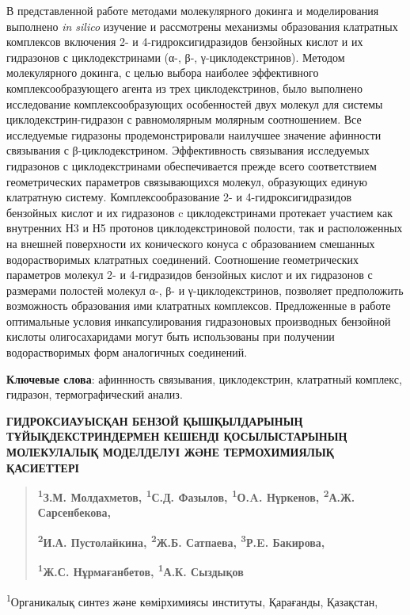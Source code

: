В представленной работе методами молекулярного докинга и моделирования
выполнено \emph{in silico} изучение и рассмотрены механизмы образования
клатратных комплексов включения 2- и 4-гидроксигидразидов бензойных
кислот и их гидразонов с циклодекстринами (α-, β-, γ-циклодекстринов).
Методом молекулярного докинга, с целью выбора наиболее эффективного
комплексообразующего агента из трех циклодекстринов, было выполнено
исследование комплексообразующих особенностей двух молекул для системы
циклодекстрин-гидразон с равномолярным молярным соотношением. Все
исследуемые гидразоны продемонстрировали наилучшее значение афинности
связывания с β-циклодекстрином. Эффективность связывания исследуемых
гидразонов с циклодекстринами обеспечивается прежде всего соответствием
геометрических параметров связывающихся молекул, образующих единую
клатратную систему. Комплексообразование 2- и 4-гидроксигидразидов
бензойных кислот и их гидразонов c циклодекстринами протекает участием
как внутренних Н3 и Н5 протонов циклодекстриновой полости, так и
расположенных на внешней поверхности их конического конуса с
образованием смешанных водорастворимых клатратных соединений.
Соотношение геометрических параметров молекул 2- и 4-гидразидов
бензойных кислот и их гидразонов с размерами полостей молекул α-, β- и
γ-циклодекстринов, позволяет предположить возможность образования ими
клатратных комплексов. Предложенные в работе оптимальные условия
инкапсулирования гидразоновых производных бензойной кислоты
олигосахаридами могут быть использованы при получении водорастворимых
форм аналогичных соединений.

{\bfseries Ключевые слова}: афиннность связывания, циклодекстрин,
клатратный комплекс, гидразон, термографический анализ.

{\bfseries ГИДРОКСИАУЫСҚАН БЕНЗОЙ ҚЫШҚЫЛДАРЫНЫҢ ТҰЙЫҚДЕКСТРИНДЕРМЕН КЕШЕНДІ
ҚОСЫЛЫСТАРЫНЫҢ МОЛЕКУЛАЛЫҚ МОДЕЛДЕЛУІ ЖӘНЕ ТЕРМОХИМИЯЛЫҚ ҚАСИЕТТЕРІ}

\begin{quote}
{\bfseries \textsuperscript{1}З.М. Молдахметов, \textsuperscript{1}С.Д.
Фазылов\textsuperscript{\envelope }, \textsuperscript{1}О.A. Нүркенов,
\textsuperscript{2}А.Ж. Сарсенбекова,}

{\bfseries \textsuperscript{2}И.А. Пустолайкина, \textsuperscript{2}Ж.Б.
Сатпаева, \textsuperscript{3}Р.E. Бакирова,}

{\bfseries \textsuperscript{1}Ж.С. Нұрмағанбетов, \textsuperscript{1}А.К.
Сыздықов}
\end{quote}

\textsuperscript{1}Органикалық синтез және көмірхимиясы институты,
Қарағанды, Қазақстан,

